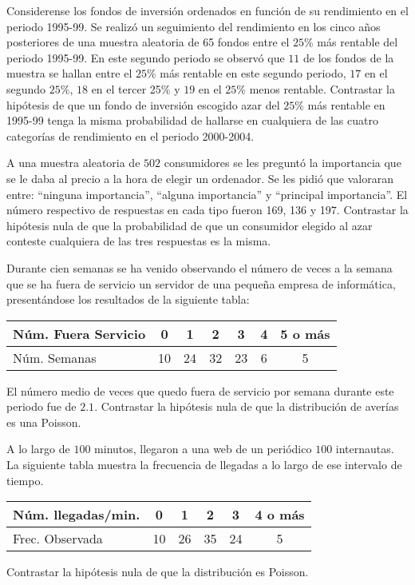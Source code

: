 \documentclass[12pt]{article}
\begin{document}
\begin{prob}
Considerense los fondos de inversión ordenados en función de su rendimiento en el periodo
1995-99. Se realizó un seguimiento del rendimiento en los cinco años posteriores de una
muestra aleatoria de 65 fondos entre el $25\%$ más rentable del periodo 1995-99. En este
segundo periodo se observó que $11$ de los fondos de la muestra se hallan entre el $25\%$
más rentable en este segundo periodo, $17$ en el segundo $25\%$, $18$ en el tercer 25\% y
$19$ en el $25\%$ menos rentable. Contrastar la hipótesis de que un fondo de inversión
escogido azar del $25\%$ más rentable en 1995-99 tenga la misma probabilidad de hallarse en
cualquiera de las cuatro categorías de rendimiento en el periodo 2000-2004.
\end{prob}

\begin{prob}
    A una muestra aleatoria de $502$ consumidores se les preguntó la
    importancia que se le daba al precio a la hora de elegir un
    ordenador. Se les pidió que valoraran entre: ``ninguna
    importancia'', ``alguna importancia'' y ``principal importancia''. El
    número respectivo de respuestas en cada tipo fueron 169, 136 y 197.
    Contrastar la hipótesis nula de que la probabilidad de que un
    consumidor elegido al azar conteste cualquiera de las tres
    respuestas es la misma.
    \end{prob}


\begin{prob}
Durante cien semanas se ha venido observando el número de veces a la semana que se ha fuera
de servicio  un servidor de una pequeña empresa de informática, presentándose los
resultados de la siguiente tabla:

\begin{tabular}{|l|cccccc|}
    \hline
    Núm. Fuera Servicio & 0 & 1 & 2 & 3 & 4 & 5 o más\\
    \hline
    Núm. Semanas & 10 & 24 & 32 & 23 & 6 & 5\\
    \hline
\end{tabular}

El número medio de veces que quedo fuera de servicio por semana durante este periodo fue de
$2.1$. Contrastar la hipótesis nula de que la distribución de averías es una Poisson.
    \end{prob}


    \begin{prob}
        A lo largo de $100$ minutos, llegaron a una web de un periódico $100$
        internautas. La siguiente tabla muestra la frecuencia de llegadas a
        lo largo de ese intervalo de tiempo.

        \begin{tabular}{|l|ccccc|}
    \hline
    Núm. llegadas/min. & 0 & 1 & 2 & 3 & 4 o más\\
    \hline
    Frec. Observada & 10 & 26& 35 & 24 & 5 \\
    \hline
\end{tabular}

        Contrastar la hipótesis nula de
        que la distribución es Poisson.
        \end{prob}
\end{document}

